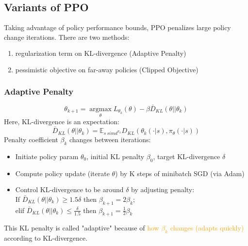 \documentclass{article}
\begin{document}
\subsection{Variants of PPO}
Taking advantage of policy performance bounds, PPO penalizes large policy change iterations. There are two methods: 
\begin{enumerate}
\item regularization term on KL-divergence (Adaptive Penalty)
\item pessimistic objective on far-away policies (Clipped Objective)
\end{enumerate}

\begin{thmbox}
    \subsubsection*{Adaptive Penalty}
    \begin{equation*}
        \theta_{k+1} = \mathop{\arg\max}\limits_{\theta} L_{\theta_k} (\theta) - \beta \bar{D}_{KL} (\theta || \theta_k)
    \end{equation*}
    Here, KL-divergence is an expectation:
    \begin{equation*}
        \bar{D}_{KL} (\theta || \theta_k) = \mathbb{E}_{s \ sim d^{\pi_k}} D_{KL} \left( \theta_{k} (\cdot | s), \pi_{\theta} (\cdot | s) \right)
    \end{equation*}
    Penalty coefficient $\beta_k$ changes between iterations:
    \begin{itemize}
    \item Initiate policy param $\theta_0$, initial KL penalty $\beta_0$, target KL-divergence $\delta$
    \item Compute policy update (iterate $\theta$) by K steps of minibatch SGD (via Adam)
    \item Control KL-divergence to be around $\delta$ by adjusting penalty:
        \\If $\bar{D}_{KL} (\theta || \theta_k) \geq 1.5 \delta$ then $\beta_{k+1} = 2 \beta_{k}$;
        \\elif $\bar{D}_{KL} (\theta || \theta_k) \leq \frac{\delta}{1.5}$ then $\beta_{k+1} = \frac{1}{2} \beta_{k}$
    \end{itemize}
    This KL penalty is called "adaptive" because of \textcolor{orange}{how $\beta_k$ changes (adapts quickly)} according to KL-divergence.
\end{thmbox}
\end{document}
